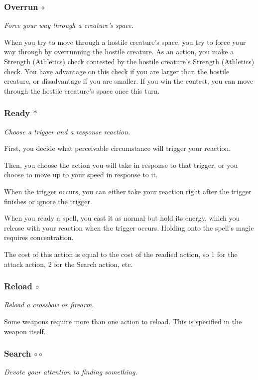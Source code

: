 \subsubsection{Overrun $\circ$} \label{act::overrun}
    \textit{Force your way through a creature's space.}

    When you try to move through a hostile creature's space, you try to force your way through by overrunning the hostile creature.
    As an action, you make a Strength (Athletics) check contested by the hostile creature's Strength (Athletics) check.
    You have advantage on this check if you are larger than the hostile creature, or disadvantage if you are smaller.
    If you win the contest, you can move through the hostile creature's space once this turn.
\subsubsection{Ready $\ast$} \label{act::ready}
    \textit{Choose a trigger and a response reaction.}

    First, you decide what perceivable circumstance will trigger your reaction.

    Then, you choose the action you will take in response to that trigger, or you choose to move up to your speed in response to it.

    When the trigger occurs, you can either take your reaction right after the trigger finishes or ignore the trigger.

    When you ready a spell, you cast it as normal but hold its energy, which you release with your reaction when the trigger occurs.
    Holding onto the spell's magic requires concentration.

    The cost of this action is equal to the cost of the readied action, so 1 for the attack action, 2 for the Search action, etc.
\subsubsection{Reload $\circ$} \label{act::reload}
    \textit{Reload a crossbow or firearm.}

    Some weapons require more than one action to reload.
    This is specified in the weapon itself.
\subsubsection{Search $\circ\circ$} \label{act::search}
    \textit{Devote your attention to finding something.}

